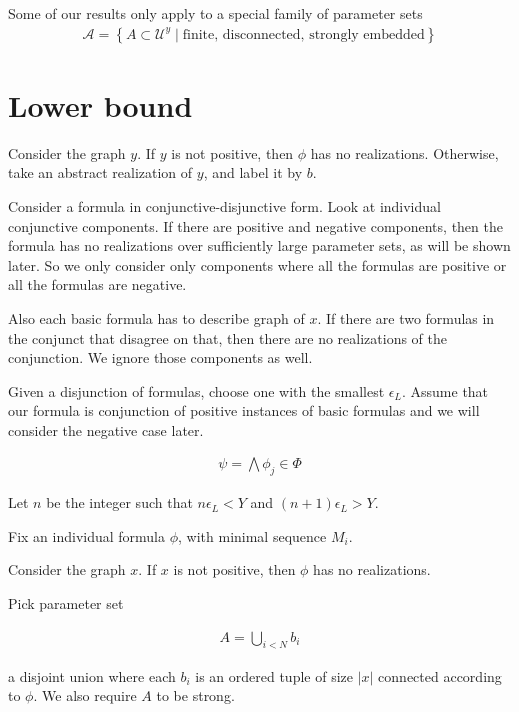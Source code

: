 \documentclass{amsart}
\renewcommand{\AA}{\mathscr A}
\newcommand{\U}{\mathcal U}
\newcommand{\curly}[1]{\left\{#1\right\}}
\begin{document}
Some of our results only apply to a special family of parameter sets
\begin{align*}
	\AA = \curly{A \subset \U^{y} \mid \text{finite, disconnected, strongly embedded}}
\end{align*}

\section{Lower bound}

Consider the graph $y$.
If $y$ is not positive, then $\phi$ has no realizations.
Otherwise, take an abstract realization of $y$, and label it by $b$.

Consider a formula in conjunctive-disjunctive form. Look at individual conjunctive components. If there are positive and negative components, then the formula has no realizations over sufficiently large parameter sets, as will be shown later. So we only consider only components where all the formulas are positive or all the formulas are negative.

Also each basic formula has to describe graph of $x$.
If there are two formulas in the conjunct that disagree on that, then there are no realizations of the conjunction.
We ignore those components as well. 

Given a disjunction of formulas, choose one with the smallest $\epsilon_L$.
Assume that our formula is conjunction of positive instances of basic formulas and we will consider the negative case later.

\begin{align*}
	\psi = \bigwedge \phi_j \in \Phi
\end{align*}

Let $n$ be the integer such that $n \epsilon_L < Y$ and $(n+1) \epsilon_L > Y$.

Fix an individual formula $\phi$, with minimal sequence $M_i$.

Consider the graph $x$.
If $x$ is not positive, then $\phi$ has no realizations.

Pick parameter set 

\begin{align*}
	A = \bigcup_{i<N} b_i
\end{align*}

a disjoint union where each $b_i$ is an ordered tuple of size $|x|$ connected according to $\phi$.
We also require $A$ to be strong.
\end{document}
